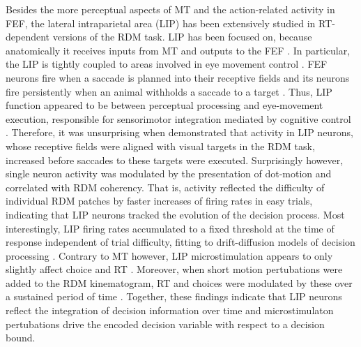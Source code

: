 Besides the more perceptual aspects of MT and the action-related activity in FEF, the lateral intraparietal area (LIP) has been extensively studied in RT-dependent versions of the RDM task. LIP has been focused on, because anatomically it receives inputs from MT and outputs to the FEF \parencite{Andersen1992,Blatt1990,Lewis2000}. In particular, the LIP is tightly coupled to areas involved in eye movement control \parencite{Andersen1990}. FEF neurons fire when a saccade is planned into their receptive fields \parencite{Andersen1987} and its neurons fire persistently when an animal withholds a saccade to a target \parencite{Barash1991,Gnadt1988}. Thus, LIP function appeared to be between perceptual processing and eye-movement execution, responsible for sensorimotor integration mediated by cognitive control \parencite[for review,][]{Andersen2002}. Therefore, it was unsurprising when \textcite{Shadlen1996,Shadlen2001} demonstrated that activity in LIP neurons, whose receptive fields were aligned with visual targets in the RDM task, increased before saccades to these targets were executed. Surprisingly however, single neuron activity was modulated by the presentation of dot-motion and correlated with RDM coherency. That is, activity reflected the difficulty of individual RDM patches by faster increases of firing rates in easy trials, indicating that LIP neurons tracked the evolution of the decision process. Most interestingly, LIP firing rates accumulated to a fixed threshold at the time of response independent of trial difficulty, fitting to drift-diffusion models of decision processing \parencite{Roitman2002a,Shadlen1996,Shadlen2001}. Contrary to MT however, LIP microstimulation appears to only slightly affect choice and RT \parencite{Hanks2006}. Moreover, when short motion pertubations were added to the RDM kinematogram, RT and choices were modulated by these over a sustained period of time \parencite{Huk2005}. Together, these findings indicate that LIP neurons reflect the integration of decision information over time and microstimulaton pertubations drive the encoded decision variable with respect to a decision bound. 
